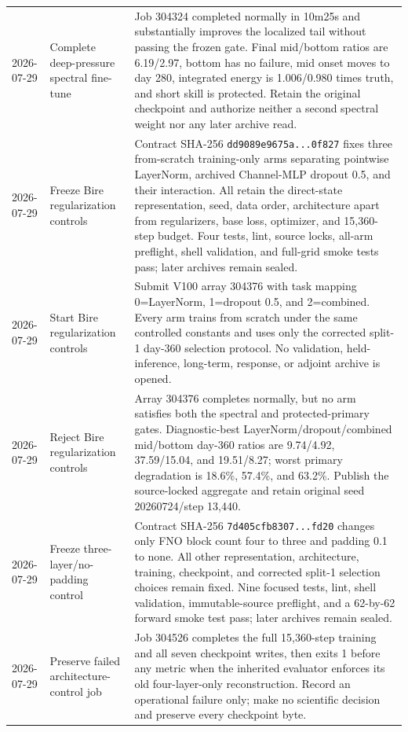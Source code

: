 \documentclass[11pt]{article}
\begin{document}
\begin{longtable}{@{}p{}p{}p{}@{}}
2026-07-29 & Complete deep-pressure spectral fine-tune & Job 304324 completed normally in 10m25s and substantially improves the localized tail without passing the frozen gate.  Final mid/bottom ratios are 6.19/2.97, bottom has no failure, mid onset moves to day 280, integrated energy is 1.006/0.980 times truth, and short skill is protected.  Retain the original checkpoint and authorize neither a second spectral weight nor any later archive read. \\
2026-07-29 & Freeze Bire regularization controls & Contract SHA-256 \texttt{dd9089e9675a...0f827} fixes three from-scratch training-only arms separating pointwise LayerNorm, archived Channel-MLP dropout 0.5, and their interaction.  All retain the direct-state representation, seed, data order, architecture apart from regularizers, base loss, optimizer, and 15,360-step budget.  Four tests, lint, source locks, all-arm preflight, shell validation, and full-grid smoke tests pass; later archives remain sealed. \\
2026-07-29 & Start Bire regularization controls & Submit V100 array 304376 with task mapping 0=LayerNorm, 1=dropout 0.5, and 2=combined.  Every arm trains from scratch under the same controlled constants and uses only the corrected split-1 day-360 selection protocol.  No validation, held-inference, long-term, response, or adjoint archive is opened. \\
2026-07-29 & Reject Bire regularization controls & Array 304376 completes normally, but no arm satisfies both the spectral and protected-primary gates.  Diagnostic-best LayerNorm/dropout/combined mid/bottom day-360 ratios are 9.74/4.92, 37.59/15.04, and 19.51/8.27; worst primary degradation is 18.6\%, 57.4\%, and 63.2\%.  Publish the source-locked aggregate and retain original seed 20260724/step 13,440. \\
2026-07-29 & Freeze three-layer/no-padding control & Contract SHA-256 \texttt{7d405cfb8307...fd20} changes only FNO block count four to three and padding 0.1 to none.  All other representation, architecture, training, checkpoint, and corrected split-1 selection choices remain fixed.  Nine focused tests, lint, shell validation, immutable-source preflight, and a 62-by-62 forward smoke test pass; later archives remain sealed. \\
2026-07-29 & Preserve failed architecture-control job & Job 304526 completes the full 15,360-step training and all seven checkpoint writes, then exits 1 before any metric when the inherited evaluator enforces its old four-layer-only reconstruction.  Record an operational failure only; make no scientific decision and preserve every checkpoint byte. \\

\end{longtable}
\end{document}
